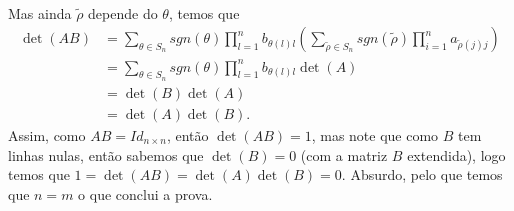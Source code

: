 \begin{homeworkProblem}
\begin{solution}
\begin{align*}
\end{align*}
Mas ainda $\tilde{\rho}$ depende do $\theta$, temos que
\begin{align*}
  \det(AB)&=\sum_{\theta\in S_n}sgn(\theta)\prod_{l=1}^{n}b_{\theta(l)l}\left(\sum_{\tilde{\rho}\in S_{n}}sgn(\tilde{\rho})\prod_{i=1}^{n}a_{\tilde{\rho}(j)j}\right)\\
  &=\sum_{\theta\in S_n}sgn(\theta)\prod_{l=1}^{n}b_{\theta(l)l}\det(A)\\
  &=\det(B)\det(A)\\
  &=\det(A)\det(B).
\end{align*}
Assim, como $AB=Id_{n\times n}$, então $\det(AB)=1$, mas note que como $B$ tem linhas nulas, então sabemos que $\det(B)=0$ (com a matriz $B$ extendida), logo temos que $1=\det(AB)=\det(A)\det(B)=0$. Absurdo, pelo que temos que $n=m$ o que conclui a prova.  
  \end{solution}
\end{homeworkProblem}
